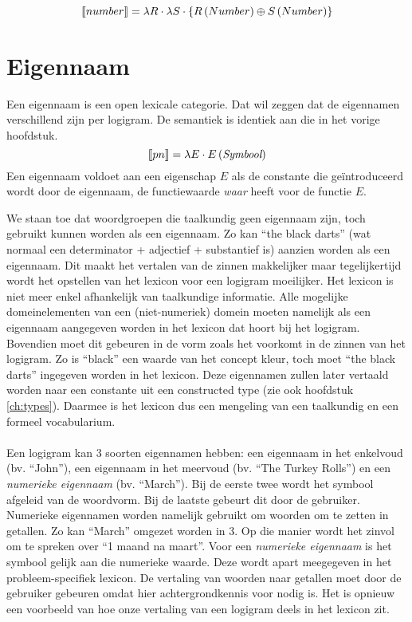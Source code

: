 $$\llbracket number\rrbracket = \lambda R \cdot \lambda S \cdot \left\{ R \left( Number \right) \oplus S \left( Number \right) \right\}$$

\section{Eigennaam}
Een eigennaam is een open lexicale categorie. Dat wil zeggen dat de eigennamen verschillend zijn per logigram. De semantiek is identiek aan die in het vorige hoofdstuk. $$\llbracket pn\rrbracket = \lambda E \cdot E \left( \textit{Symbool} \right)$$ Een eigennaam voldoet aan een eigenschap $E$ als de constante die geïntroduceerd wordt door de eigennaam, de functiewaarde \textit{waar} heeft voor de functie $E$.

We staan toe dat woordgroepen die taalkundig geen eigennaam zijn, toch gebruikt kunnen worden als een eigennaam. Zo kan ``the black darts'' (wat normaal een determinator + adjectief + substantief is) aanzien worden als een eigennaam. Dit maakt het vertalen van de zinnen makkelijker maar tegelijkertijd wordt het opstellen van het lexicon voor een logigram moeilijker. Het lexicon is niet meer enkel afhankelijk van taalkundige informatie. Alle mogelijke domeinelementen van een (niet-numeriek) domein moeten namelijk als een eigennaam aangegeven worden in het lexicon dat hoort bij het logigram. Bovendien moet dit gebeuren in de vorm zoals het voorkomt in de zinnen van het logigram. Zo is ``black'' een waarde van het concept kleur, toch moet ``the black darts'' ingegeven worden in het lexicon. Deze eigennamen zullen later vertaald worden naar een constante uit een constructed type (zie ook hoofdstuk \ref{ch:types}). Daarmee is het lexicon dus een mengeling van een taalkundig en een formeel vocabularium.

\paragraph{}Een logigram kan 3 soorten eigennamen hebben: een eigennaam in het enkelvoud (bv. ``John''), een eigennaam in het meervoud (bv. ``The Turkey Rolls'') en een \textit{numerieke eigennaam} (bv. ``March''). Bij de eerste twee wordt het symbool afgeleid van de woordvorm. Bij de laatste gebeurt dit door de gebruiker. Numerieke eigennamen worden namelijk gebruikt om woorden om te zetten in getallen. Zo kan ``March'' omgezet worden in 3. Op die manier wordt het zinvol om te spreken over ``1 maand na maart''. Voor een \textit{numerieke eigennaam} is het symbool gelijk aan die numerieke waarde. Deze wordt apart meegegeven in het probleem-specifiek lexicon. De vertaling van woorden naar getallen moet door de gebruiker gebeuren omdat hier achtergrondkennis voor nodig is. Het is opnieuw een voorbeeld van hoe onze vertaling van een logigram deels in het lexicon zit.

